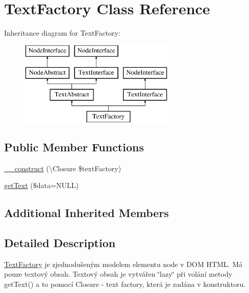 \hypertarget{class_pes_1_1_dom_1_1_node_1_1_text_1_1_text_factory}{}\section{Text\+Factory Class Reference}
\label{class_pes_1_1_dom_1_1_node_1_1_text_1_1_text_factory}
Inheritance diagram for Text\+Factory\+:\begin{figure}[H]
\begin{center}
\leavevmode
\includegraphics[height=4.000000cm]{class_pes_1_1_dom_1_1_node_1_1_text_1_1_text_factory}
\end{center}
\end{figure}
\subsection*{Public Member Functions}
\begin{DoxyCompactItemize}
\item 
\mbox{\hyperlink{class_pes_1_1_dom_1_1_node_1_1_text_1_1_text_factory_a9793d54d2e9e11035e272c9eee7a27ae}{\+\_\+\+\_\+construct}} (\textbackslash{}Closure \$text\+Factory)
\item 
\mbox{\hyperlink{class_pes_1_1_dom_1_1_node_1_1_text_1_1_text_factory_a30976462a9b118ae09717b3179751e10}{get\+Text}} (\$data=N\+U\+LL)
\end{DoxyCompactItemize}
\subsection*{Additional Inherited Members}


\subsection{Detailed Description}
\mbox{\hyperlink{class_pes_1_1_dom_1_1_node_1_1_text_1_1_text_factory}{Text\+Factory}} je zjednodušeným modelem elementu node v D\+OM H\+T\+ML. Má pouze textový obsah. Textový obsah je vytvářen \char`\"{}lazy\char`\"{} při volání metody get\+Text() a to pomocí Closure -\/ text factory, která je zadána v konstruktoru.

